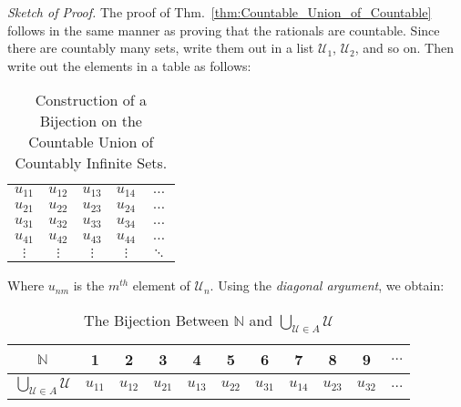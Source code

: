             \textit{Sketch of Proof.} The proof of
            Thm.~\ref{thm:Countable_Union_of_Countable}
            follows in the same manner
            as proving that the rationals are countable. Since
            there are countably many sets, write them out in
            a list $\mathcal{U}_{1}$, $\mathcal{U}_{2}$, and
            so on. Then write out the elements in a table as
            follows:
            \begin{table}[H]
                \captionsetup{type=table}
                \centering
                \begin{tabular}{ccccc}
                    $u_{11}$&$u_{12}$&$u_{13}$
                    &$u_{14}$&$\hdots$\\
                    $u_{21}$&$u_{22}$&$u_{23}$
                    &$u_{24}$&$\hdots$\\
                    $u_{31}$&$u_{32}$&$u_{33}$
                    &$u_{34}$&$\hdots$\\
                    $u_{41}$&$u_{42}$&$u_{43}$
                    &$u_{44}$&$\hdots$\\
                    $\vdots$&$\vdots$&$\vdots$
                    &$\vdots$&$\ddots$
                \end{tabular}
                \caption{Construction of a Bijection on the
                         Countable Union of Countably Infinite
                         Sets.}
                \label{table:Func_Countable_Union_of_Countable}
            \end{table}
            Where $u_{nm}$ is the $m^{th}$ element of
            $\mathcal{U}_{n}$.
            Using the \textit{diagonal argument},
            we obtain:
            \begin{table}[H]
                \captionsetup{type=table}
                \centering
                \begin{tabular}{|c|c|c|c|c|c|c|c|c|c|c|}
                    \hline
                    $\mathbb{N}$&1&2&3&4&5&6&7&8&9&$\hdots$\\
                    \hline
                    $\bigcup_{\mathcal{U}\in{A}}\mathcal{U}$&
                    $u_{11}$&$u_{12}$&$u_{21}$&$u_{13}$&
                    $u_{22}$&$u_{31}$&$u_{14}$&$u_{23}$&
                    $u_{32}$&$\hdots$\\
                    \hline
                \end{tabular}
                \caption{The Bijection Between $\mathbb{N}$ and
                         $\bigcup_{\mathcal{U}\in{A}}\mathcal{U}$}
                \label{table:Bijection_on_Countable_Union}
            \end{table}

